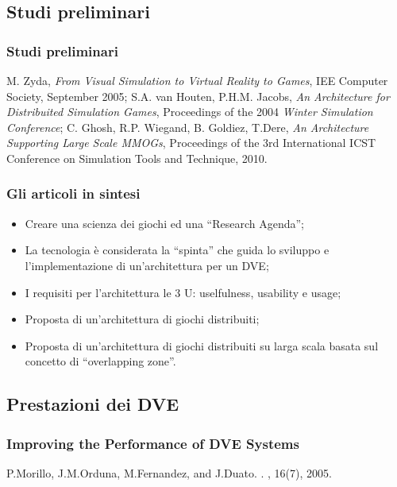 \subsection*{Studi preliminari}

\begin{frame}
\frametitle{Studi preliminari}
\begin{thebibliography}{}
 M. Zyda, \emph{From Visual Simulation to Virtual Reality to
Games}, IEE Computer Society, September 2005;
 S.A. van Houten, P.H.M. Jacobs, \emph{An Architecture for
Distribuited Simulation Games},
Proceedings of the 2004 \emph{Winter Simulation Conference};
 C. Ghosh, R.P. Wiegand, B. Goldiez, T.Dere, \emph{An
Architecture Supporting Large Scale MMOGs},
Proceedings of the 3rd International ICST Conference on Simulation Tools
and Technique, 2010.
\end{thebibliography}
\end{frame}

\begin{frame}
\frametitle{Gli articoli in sintesi}
\begin{itemize}%
\item
Creare una scienza dei giochi ed una ``Research Agenda'';
\item
La tecnologia è considerata la ``spinta''  che guida lo sviluppo e
l'implementazione di un'architettura per un DVE;
\item
I requisiti per l'architettura le 3 U: \alert{uselfulness}, \alert{usability} e
\alert{usage};
\item
Proposta di un'architettura di giochi distribuiti;
\item
Proposta di un'architettura di giochi distribuiti su larga scala basata
sul concetto di ``overlapping zone''.
\end{itemize}
\end{frame}


\subsection*{Prestazioni dei DVE} %

\begin{frame}
\frametitle{Improving the Performance of DVE Systems}
\begin{thebibliography}{}
P.Morillo, J.M.Orduna, M.Fernandez, and J.Duato.
.
, 16(7),
  2005.
\end{thebibliography}
\end{frame}

